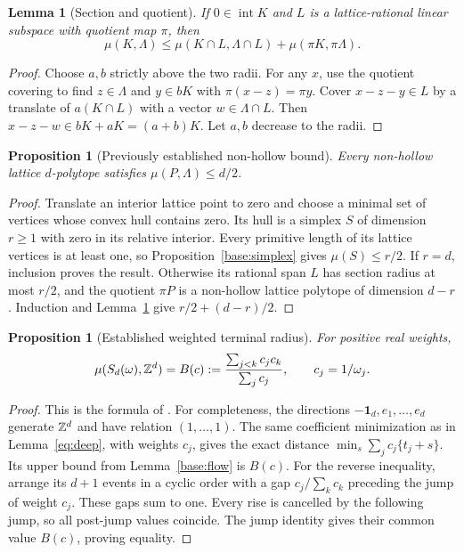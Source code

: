 \documentclass[11pt,a4paper]{article}
\newtheorem{lemma}[theorem]{Lemma}
\newtheorem{proposition}[theorem]{Proposition}
\theoremstyle{remark}\newtheorem{remark}[theorem]{Remark}
\begin{document}
\begin{lemma}[Section and quotient]\label{base:section}
If $0\in\operatorname{int}K$ and $L$ is a lattice-rational linear
subspace with quotient map $\pi$, then
\[
 \mu(K,\Lambda)\le
 \mu(K\cap L,\Lambda\cap L)+\mu(\pi K,\pi\Lambda).
\]
\end{lemma}
\begin{proof}
Choose $a,b$ strictly above the two radii. For any $x$, use the
quotient covering to find $z\in\Lambda$ and $y\in bK$ with
$\pi(x-z)=\pi y$. Cover $x-z-y\in L$ by a translate of
$a(K\cap L)$ with a vector $w\in\Lambda\cap L$.
Then $x-z-w\in bK+aK=(a+b)K$. Let $a,b$ decrease to the radii.
\end{proof}

\begin{proposition}[Previously established non-hollow bound]\label{base:nonhollow}
Every non-hollow lattice $d$-polytope satisfies $\mu(P,\Lambda)\le d/2$.
\end{proposition}
\begin{proof}
Translate an interior lattice point to zero and choose a minimal set
of vertices whose convex hull contains zero. Its hull is a simplex
$S$ of dimension $r\ge1$ with zero in its relative interior.
Every primitive length of its lattice vertices is at least one,
so Proposition~\ref{base:simplex} gives $\mu(S)\le r/2$.
If $r=d$, inclusion proves the result. Otherwise its rational span
$L$ has section radius at most $r/2$, and the quotient $\pi P$ is
a non-hollow lattice polytope of dimension $d-r$. Induction and
Lemma~\ref{base:section} give $r/2+(d-r)/2$.
\end{proof}

\begin{proposition}[Established weighted terminal radius]\label{base:weighted}
For positive real weights,
\[
 \mu(S_d(\omega),\mathbb Z^d)=
 B(c):=\frac{\sum_{j<k}c_jc_k}{\sum_jc_j},
 \qquad c_j=1/\omega_j.
\]
\end{proposition}
\begin{proof}
This is the formula of \cite[Theorem 1.4]{CSS}. For completeness,
the directions $-\mathbf1_d,e_1,\ldots,e_d$ generate $\mathbb Z^d$ and
have relation $(1,\ldots,1)$. The same coefficient minimization
as in Lemma~\ref{eq:deep}, with weights $c_j$, gives the exact
distance $\min_s\sum_jc_j\{t_j+s\}$. Its upper bound from
Lemma~\ref{base:flow} is $B(c)$. For the reverse inequality,
arrange its $d+1$ events in a cyclic order with a gap
$c_j/\sum_kc_k$ preceding the jump of weight $c_j$. These gaps
sum to one. Every rise is cancelled by the following jump, so
all post-jump values coincide. The jump identity gives their
common value $B(c)$, proving equality.
\end{proof}
\end{document}
